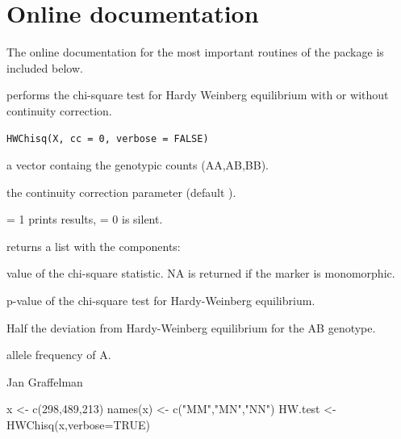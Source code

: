 \documentclass[a4paper]{article}
\begin{document}
\clearpage

\section{Online documentation}
\label{sec:online}

The online documentation for the most important routines of the package is
included below.

\begin{Description}\relax
{} performs the chi-square test for Hardy Weinberg
equilibrium with or without continuity correction.
\end{Description}
\begin{Usage}
\begin{verbatim}
HWChisq(X, cc = 0, verbose = FALSE)
\end{verbatim}
\end{Usage}
\begin{Arguments}
\begin{ldescription}
\item[\code{X}]  a vector containg the genotypic counts (AA,AB,BB).
\item[\code{cc}]  the continuity correction parameter (default ).
\item[\code{verbose}]  = 1 prints results,  = 0 is silent.
\end{ldescription}
\end{Arguments}
\begin{Value}
 returns a list with the components:
\begin{ldescription}
\item[\code{chisq }] value of the chi-square statistic. NA is returned if the marker is monomorphic.
\item[\code{pval }] p-value of the chi-square test for Hardy-Weinberg equilibrium.
\item[\code{D }] Half the deviation from Hardy-Weinberg equilibrium for the AB genotype.
\item[\code{p }] allele frequency of A.
\end{ldescription}
\end{Value}
\begin{Author}\relax
Jan Graffelman 
\end{Author}
\begin{SeeAlso}\relax
{}
\end{SeeAlso}
\begin{Examples}
\begin{ExampleCode}
x <- c(298,489,213)
names(x) <- c("MM","MN","NN")
HW.test <- HWChisq(x,verbose=TRUE)
\end{ExampleCode}
\end{Examples}
\end{document}
